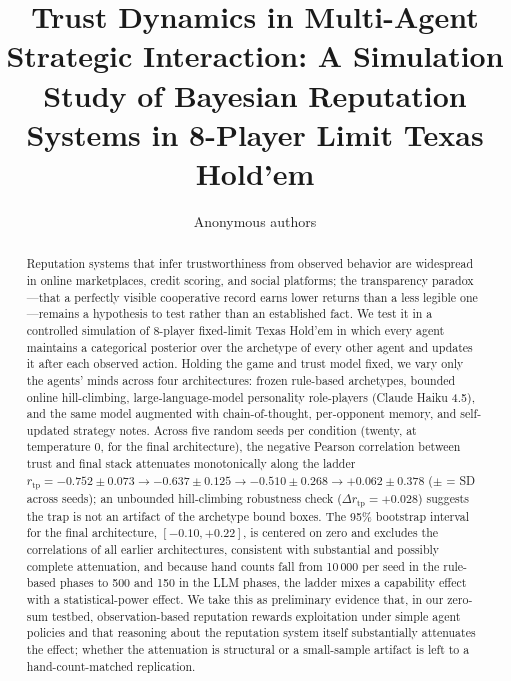 \documentclass[journal]{IEEEtran}
\title{Trust Dynamics in Multi-Agent Strategic Interaction:
  A Simulation Study of Bayesian Reputation Systems in
  8-Player Limit Texas Hold'em}
\author{Anonymous authors}
\newcommand{\rtp}{\ensuremath{r_{\mathrm{tp}}}}
\begin{document}
\maketitle

\begin{abstract}
      Reputation systems that infer trustworthiness from observed
      behavior are widespread in online marketplaces, credit scoring,
      and social platforms; the transparency paradox---that a
      perfectly visible cooperative record earns lower returns than a
      less legible one---remains a hypothesis to test rather than an
      established fact. We test it in a controlled simulation of
      8-player fixed-limit Texas Hold'em in which every agent
      maintains a categorical posterior over the archetype of every
      other agent and updates it after each observed action. Holding
      the game and trust model fixed, we vary only the agents' minds
      across four architectures: frozen rule-based archetypes,
      bounded online hill-climbing, large-language-model personality
      role-players (Claude Haiku 4.5), and the same model augmented
      with chain-of-thought, per-opponent memory, and self-updated
      strategy notes. Across five random seeds per condition (twenty, at temperature 0, for the final architecture), the negative Pearson correlation between trust and final stack attenuates monotonically along the ladder $\rtp = -0.752 \pm 0.073 \rightarrow -0.637 \pm 0.125 \rightarrow -0.510 \pm 0.268 \rightarrow +0.062 \pm 0.378$ ($\pm$ = SD across seeds); an unbounded hill-climbing robustness check
      ($\Delta\rtp = +0.028$) suggests the trap is not an artifact
      of the archetype bound boxes. The 95\% bootstrap interval for the final architecture, $[-0.10, +0.22]$, is centered on zero and excludes the correlations of all earlier architectures, consistent with substantial and possibly complete attenuation, and
      because hand counts fall from 10\,000 per seed in the
      rule-based phases to 500 and 150 in the LLM phases, the ladder
      mixes a capability effect with a statistical-power effect. We
      take this as preliminary evidence that, in our zero-sum
      testbed, observation-based reputation rewards exploitation
      under simple agent policies and that reasoning about the
      reputation system itself substantially attenuates the effect;
      whether the attenuation is structural or a small-sample
      artifact is left to a hand-count-matched replication.
\end{abstract}
\end{document}
